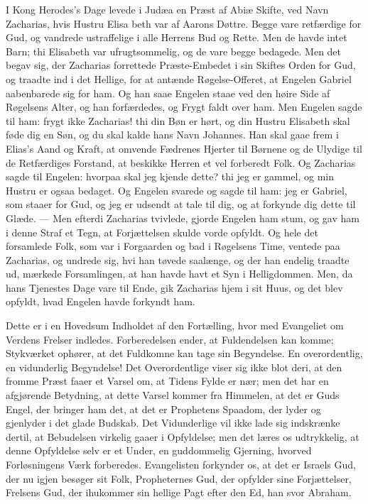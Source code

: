 \documentclass[12pt,a4paper]{book}
\begin{document}
\begingroup\large
I Kong Herodes's Dage levede i Judæa en Præst af Abiæ Skifte,
ved Navn Zacharias, hvis Hustru Elisa\-%
beth var af Aarons Døttre. Begge vare retfærdige for Gud, og
vandrede ustraffelige i alle Herrens Bud og Rette. Men de havde
intet Barn; thi Elisabeth var ufrugtsommelig, og de vare begge
bedagede. Men det begav sig, der Zacharias forrettede
Præste-Embedet i sin Skiftes Orden for Gud, og traadte ind i det
Hellige, for at antænde Røgelse-Offeret, at Engelen Gabriel
aabenbarede sig for ham. Og han saae Engelen staae ved den høire
Side af Røgelsens Alter, og han forfærdedes, og Frygt faldt over
ham. Men Engelen sagde til ham: frygt ikke Zacharias! thi din
Bøn er hørt, og din Hustru Elisabeth skal føde dig en Søn, og du
skal kalde hans Navn Johannes. Han skal gaae frem i Elias's Aand
og Kraft, at omvende Fædrenes Hjerter til Børnene og de Ulydige
til de Retfærdiges Forstand, at beskikke Herren et vel forberedt
Folk. Og Zacharias sagde til Engelen: hvorpaa skal jeg kjende
dette? thi jeg er gammel, og min Hustru er ogsaa bedaget. Og
Engelen svarede og sagde til ham: jeg er Gabriel, som staaer for
Gud, og jeg er udsendt at tale til dig, og at forkynde dig dette
til Glæde. --- Men efterdi Zacharias tvivlede, gjorde Engelen ham
stum, og gav ham i denne Straf et Tegn, at Forjættelsen skulde
vorde opfyldt. Og hele det forsamlede Folk, som var i Forgaarden
og bad i Røgelsens Time, ventede paa Zacharias, og undrede sig,
hvi han tøvede saalænge, og der han endelig traadte ud, mærkede
Forsamlingen, at han havde havt et Syn i Helligdommen. Men, da
hans Tjenestes Dage vare til Ende, gik Zacharias hjem i sit Huus,
og det blev opfyldt, hvad Engelen havde forkyndt ham.
\par\endgroup

Dette er i en Hovedsum Indholdet af den Fortælling, hvor\-%
med Evangeliet om Verdens Frelser indledes. Forberedelsen ender,
at Fuldendelsen kan komme; Stykværket ophører, at det Fuldkomne
kan tage sin Begyndelse. En overordentlig, en vidunderlig
Begyndelse! Det Overordentlige viser sig ikke blot deri, at den
fromme Præst faaer et Varsel om, at Tidens Fylde er nær; men det
har en afgjørende Betydning, at dette Varsel kommer fra Himmelen,
at det er Guds Engel, der bringer ham det, at det er Prophetens
Spaadom, der lyder og gjenlyder i det glade Budskab. Det
Vidunderlige vil ikke lade sig indskrænke dertil, at Bebudelsen
virkelig gaaer i Opfyldelse; men det læres os udtrykkelig, at
denne Opfyldelse selv er et Under, en guddommelig Gjerning,
hvorved Forløsningens Værk forberedes. Evangelisten forkynder os,
at det er Israels Gud, der nu igjen besøger sit Folk, Propheternes
Gud, der opfylder sine Forjættelser, Frelsens Gud, der ihukommer
sin hellige Pagt efter den Ed, han svor Abraham.
\end{document}

